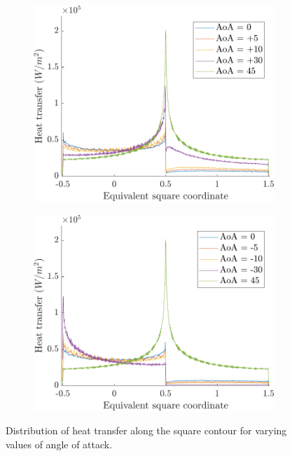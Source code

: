 \begin{figure}[H]
    \centering
    \begin{subfigure}{0.49\textwidth}
        \centering
        \includegraphics[width=\textwidth]{Images/4. Results/AoA/stsec+.pdf}
    \end{subfigure}
    \hfill
    \begin{subfigure}{0.49\textwidth}
        \centering
        \includegraphics[width=\textwidth]{Images/4. Results/AoA/stsec-.pdf}
    \end{subfigure}
    \caption{Distribution of heat transfer along the square contour for varying values of angle of attack.}
    \label{fig:aoa}
\end{figure}

